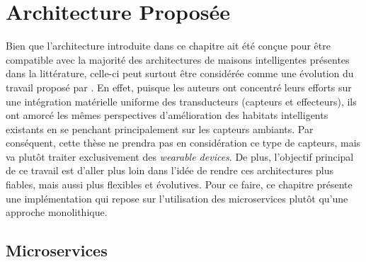 \section{Architecture Proposée}

Bien que l'architecture introduite dans ce chapitre ait été conçue pour être compatible avec la majorité des architectures de maisons intelligentes présentes dans la littérature, celle-ci peut surtout être considérée comme une évolution du travail proposé par \cite{Plantevin2018}. En effet, puisque les auteurs ont concentré leurs efforts sur une intégration matérielle uniforme des transducteurs (capteurs et effecteurs), ils ont amorcé les mêmes perspectives d'amélioration des habitats intelligents existants en se penchant principalement sur les capteurs ambiants. Par conséquent, cette thèse ne prendra pas en considération ce type de capteurs, mais va plutôt traiter exclusivement des \textit{wearable devices}. De plus, l'objectif principal de ce travail est d'aller plus loin dans l'idée de rendre ces architectures plus fiables, mais aussi plus flexibles et évolutives. Pour ce faire, ce chapitre présente une implémentation qui repose sur l'utilisation des microservices plutôt qu'une approche monolithique.

\subsection{Microservices}

